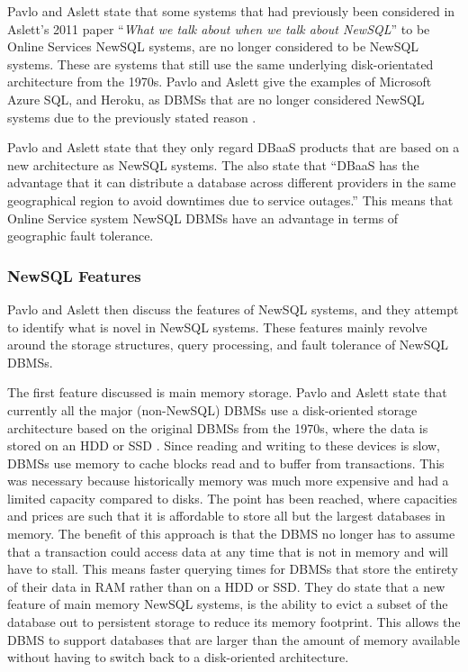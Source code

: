\documentclass[10pt, conference]{IEEEtran}
\begin{document}
Pavlo and Aslett state that some systems that had previously been considered in Aslett's 2011 paper ``\textit{What we talk about when we talk about NewSQL}'' \cite{aslett} to be Online Services NewSQL systems, are no longer considered to be NewSQL systems. These are systems that still use the same underlying disk-orientated architecture from the 1970s. Pavlo and Aslett give the examples of Microsoft Azure SQL, and Heroku, as DBMSs that are no longer considered NewSQL systems due to the previously stated reason  \cite{pavlo}. 

Pavlo and Aslett state that they only regard DBaaS products that are based on a new architecture as NewSQL systems. The also state that ``DBaaS has the advantage that it can distribute a database across different providers in the same geographical region to avoid downtimes due to service outages.''  \cite{pavlo} This means that Online Service system NewSQL DBMSs have an advantage in terms of geographic fault tolerance.

\subsubsection{NewSQL Features}

Pavlo and Aslett then discuss the features of NewSQL systems, and they attempt to identify what is novel in NewSQL systems. These features mainly revolve around the storage structures, query processing, and fault tolerance of NewSQL DBMSs.

The first feature discussed is main memory storage. Pavlo and Aslett state that currently all the major (non-NewSQL) DBMSs use a disk-oriented storage architecture based on the original DBMSs from the 1970s, where the data is stored on an HDD or SSD  \cite{pavlo}. Since reading and writing to these devices is slow, DBMSs use memory to cache blocks read and to buffer from transactions. This was necessary because historically memory was much more expensive and had a limited capacity compared to disks. The point has been reached, where capacities and prices are such that it is affordable to store all but the largest databases in memory. The benefit of this approach is that the DBMS no longer has to assume that a transaction could access data at any time that is not in memory and will have to stall. This means faster querying times for DBMSs that store the entirety of their data in RAM rather than on a HDD or SSD. They do state that a new feature of main memory NewSQL systems, is the ability to evict a subset of the database out to persistent storage to reduce its memory footprint. This allows the DBMS to support databases that are larger than the amount of memory available without having to switch back to a disk-oriented architecture. 
\end{document}

